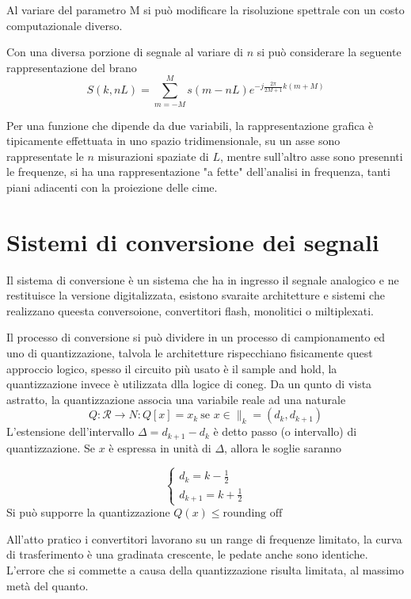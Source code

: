 Al variare del parametro M si può modificare la risoluzione spettrale con un costo
computazionale diverso.

Con una diversa porzione di segnale al variare di $n$ si può considerare la seguente rappresentazione del brano
$$
S(k,nL) = \sum_{m=-M}^{M} s(m-nL) e^{-j\frac{2\pi}{2M+1}k(m+M)}
$$

Per una funzione che dipende da due variabili, la rappresentazione grafica è tipicamente
effettuata in uno spazio tridimensionale, su un asse sono rappresentate le $n$ misurazioni
spaziate di $L$, mentre sull'altro asse sono presennti le frequenze, si ha una rappresentazione
"a fette" dell'analisi in frequenza, tanti piani adiacenti con la proiezione delle cime.

\chapter{Sistemi di conversione dei segnali}
Il sistema di conversione è un sistema che ha in ingresso il segnale analogico e ne restituisce la versione 
digitalizzata, esistono svaraite architetture e sistemi che realizzano queesta conversoione, 
convertitori flash, monolitici o miltiplexati.

Il processo di conversione si può dividere in un processo di campionamento ed uno di quantizzazione,
talvola le architetture rispecchiano fisicamente quest approccio logico, spesso il circuito più usato è
il sample and hold, la quantizzazione invece è utilizzata dlla logice di coneg. Da un qunto di vista astratto,
la quantizzazione associa una variabile reale ad una naturale
$$
Q: \mathcal{R} \longrightarrow N : Q[x] =x_k \ \text{se } x\in \|_k 
= (d_k,d_{k+1})
$$
L'estensione dell'intervallo $\Delta = d_{k+1}-d_k$ è detto passo (o intervallo) di quantizzazione.
Se $x$ è espressa in unità di $\Delta$, allora le soglie saranno

$$
\begin{cases}
    d_k = k-\frac{1}{2}\\
    d_{k+1} = k+\frac{1}{2}
\end{cases}
$$
Si può supporre la quantizzazione $Q(x) \leq \text{rounding off}$

All'atto pratico i convertitori lavorano su un range di frequenze limitato, la curva di trasferimento 
è una gradinata crescente, le pedate anche sono identiche.
L'errore che si commette a causa della quantizzazione risulta limitata, al massimo metà del quanto.

